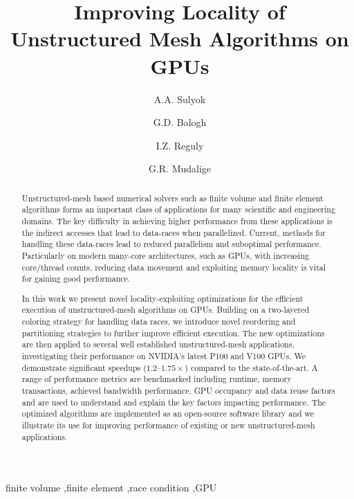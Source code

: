 \documentclass[number]{elsarticle}
\begin{document}
\begin{frontmatter}

  \title{Improving Locality of Unstructured Mesh Algorithms on GPUs}

  \author[1,2]{A.A. Sulyok}
  \author[1,2]{G.D. Balogh}
  \author[1]{I.Z. Reguly}
  \author[3]{G.R. Mudalige}
  \address[1]{
    Faculty of Information Technology and Bionics,
    Pázmány Péter Catholic University,
    Budapest, Hungary
  }
  \address[2]{
    3in-PPCU Research Group,
    Pázmány Péter Catholic University,
    Esztergom, Hungary
  }
   \address[3]{
    Department of Computer Science,
    University of Warwick,
    Coventry, United Kingdom
  }

\begin{abstract}

\noindent Unstructured-mesh based numerical solvers such as finite volume and 
finite element algorithms forms an important class of applications for many 
scientific and engineering domains. The key difficulty in achieving higher 
performance from these applications is the indirect accesses that lead to 
data-races when parallelized. Current, methods for handling these data-races 
lead to reduced parallelism and suboptimal performance. Particularly on modern 
many-core architectures, such as GPUs, with increasing core/thread counts, 
reducing data movement and exploiting memory locality is vital for gaining good 
performance. 

In this work we present novel locality-exploiting optimizations for the 
efficient execution of unstructured-mesh algorithms on GPUs. Building on a 
two-layered coloring strategy for handling data races, we introduce novel 
reordering and partitioning strategies to further improve efficient execution. 
The new optimizations are then applied to several well established 
unstructured-mesh applications, investigating their performance on NVIDIA's 
latest P100 and V100 GPUs. We demonstrate significant speedups 
($1.2\text{--}1.75\times$) compared to the state-of-the-art. A range of 
performance metrics are benchmarked including runtime, memory transactions, 
achieved bandwidth performance, GPU occupancy and data reuse factors and 
are used to understand and explain the key factors impacting performance. The 
optimized algorithms are implemented as an open-source software library and 
we illustrate its use for improving performance of existing or new 
unstructured-mesh applications.
\end{abstract}

\begin{keyword}
finite volume \sep finite element \sep race condition \sep GPU
\end{keyword}

\end{frontmatter}
\end{document}
